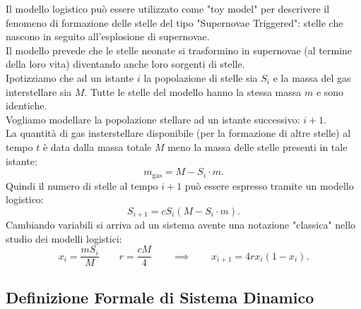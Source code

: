 \begin{exmp}
    Il modello logistico può essere utilizzato come "toy model" per descrivere il fenomeno di formazione delle stelle del tipo "Supernovae Triggered": 
    stelle che nascono in seguito all'esplosione di supernovae. \\
    Il modello prevede che le stelle neonate si trasformino in supernovae (al termine della loro vita) diventando anche loro sorgenti di stelle.
    \\
    Ipotizziamo che ad un istante $i$ la popolazione di stelle sia $S_i$ e la massa del gas interstellare sia $M$. Tutte le stelle del modello hanno la stessa massa $m$ e sono identiche. \\
    Vogliamo modellare la popolazione stellare ad un istante successivo: $i+1$.\\
    La quantità di gas insterstellare disponibile (per la formazione di altre stelle) al tempo $t$ è data dalla massa totale $M$ meno la massa delle stelle presenti in tale istante:
    \[
        m_{\text{gas}} = M-S_i\cdot m
    .\] 
    Quindi il numero di stelle al tempo $i+1$ può essere espresso tramite un modello logistico:
    \[
	S_{i+1} = cS_i (M-S_i\cdot m)
    .\] 
    Cambiando variabili si arriva ad un sistema avente una notazione "classica" nello studio dei modelli logistici:
    \[
	x_i = \frac{mS_i}{M} \qquad r = \frac{cM}{4} \qquad \implies  \qquad x_{i+1} = 4rx_i(1-x_i)
    .\] 
\end{exmp}
\noindent
\subsection{Definizione Formale di Sistema Dinamico}%
\label{sub:Definizione Formale di Sistema Dinamico}
